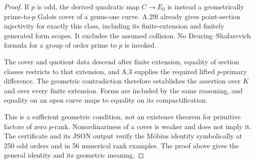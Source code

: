 \begin{proof}
If $p$ is odd, the derived quadratic map
$C\to E_0$ is instead a geometrically
prime-to-$p$ Galois cover of a genus-one
curve. A.29l already gives point-section
injectivity for exactly this class, including
its finite-extension and finitely generated
form scopes. It excludes the assumed
collision. No Deuring--Shafarevich formula
for a group of order prime to $p$ is invoked.

The cover and quotient data descend after
finite extension, equality of section classes
restricts to that extension, and A.3 supplies
the required lifted $p$-primary difference.
The geometric contradiction therefore
establishes the assertion over $K$ and over
every finite extension. Forms are included
by the same reasoning, and equality on an
open curve maps to equality on its
compactification.

This is a sufficient geometric condition,
not an existence theorem for primitive
factors of zero $p$-rank. Nonordinariness
of a cover is weaker and does not imply it.
The certificate
and its JSON output verify the M\"obius
identity symbolically at 250 odd orders and
in 56 numerical rank examples. The proof
above gives the general identity and its
geometric meaning.
\end{proof}
